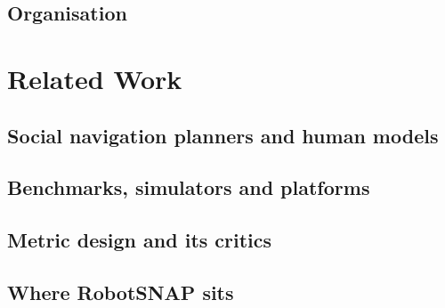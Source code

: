 \documentclass[pdflatex,sn-mathphys-num]{template/sn-jnl}%
\begin{document}
\subsection{Organisation}
\label{sec:intro:org}

\section{Related Work}
\label{sec:related}

\subsection{Social navigation planners and human models}
\label{sec:related:planners}

\subsection{Benchmarks, simulators and platforms}
\label{sec:related:benchmarks}

\subsection{Metric design and its critics}
\label{sec:related:metrics}

\subsection{Where RobotSNAP sits}
\label{sec:related:position}
\end{document}
